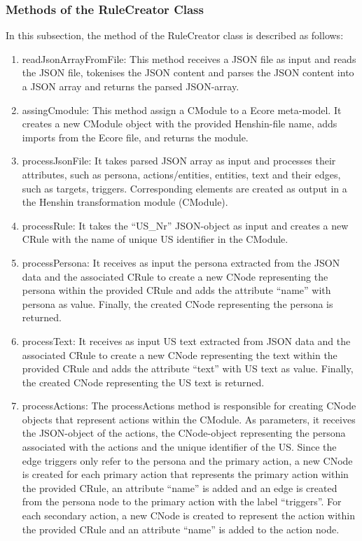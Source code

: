 \subsubsection*{Methods of the RuleCreator Class}
In this subsection, the method of the RuleCreator class is described as follows:
\begin{enumerate}
	\item readJsonArrayFromFile: This method receives a JSON file as input and reads the JSON file, tokenises the JSON content and parses the JSON content into a JSON array and returns the parsed JSON-array.
	\item assingCmodule: This method assign a CModule to a Ecore meta-model. It creates a new CModule object with the provided Henshin-file name, adds imports from the Ecore file, and returns the module.
	\item processJsonFile: It takes parsed JSON array as input and processes their attributes, such as persona, actions/entities, entities, text and their edges, such as targets, triggers. Corresponding elements are created as output in a the Henshin transformation module (CModule).
	\item processRule: It takes the \enquote{US\_Nr} JSON-object as input and creates a new CRule with the name of unique US identifier in the CModule.
	\item processPersona: It receives as input the persona extracted from the JSON data and the associated CRule to create a new CNode representing the persona within the provided CRule and adds the attribute \enquote{name} with persona as value. Finally, the created CNode representing the persona is returned.
	\item processText: It receives as input US text extracted from JSON data and the associated CRule to create a new CNode representing the text within the provided CRule and adds the attribute \enquote{text} with US text as value. Finally, the created CNode representing the US text is returned.
	\item processActions: The processActions method is responsible for creating CNode objects that represent actions within the CModule. As parameters, it receives the JSON-object of the actions, the CNode-object representing the persona associated with the actions and the unique identifier of the US. Since the edge triggers only refer to the persona and the primary action, a new CNode is created for each primary action that represents the primary action within the provided CRule, an attribute \enquote{name} is added and an edge is created from the persona node to the primary action with the label \enquote{triggers}. For each secondary action, a new CNode is created to represent the action within the provided CRule and an attribute \enquote{name} is added to the action node.

\end{enumerate}
